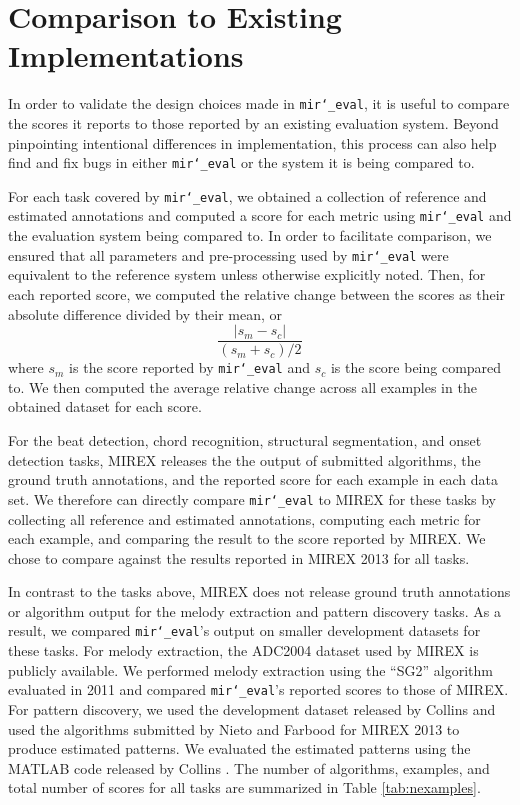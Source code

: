 \documentclass{article}
\def\mireval{\texttt{mir\char`_eval}}
\begin{document}
\section{Comparison to Existing Implementations}
\label{sec:comparison}

In order to validate the design choices made in \mireval{}, it is useful to compare the scores it reports to those reported by an existing evaluation system.
Beyond pinpointing intentional differences in implementation, this process can also help find and fix bugs in either \mireval{} or the system it is being compared to.

For each task covered by \mireval{}, we obtained a collection of reference and estimated annotations and computed a score for each metric using \mireval{} and the evaluation system being compared to.
In order to facilitate comparison, we ensured that all parameters and pre-processing used by \mireval{} were equivalent to the reference system unless otherwise explicitly noted.
Then, for each reported score, we computed the relative change between the scores as their absolute difference divided by their mean, or
$$
\frac{|s_m - s_c|}{(s_m + s_c)/2}
$$
where $s_m$ is the score reported by \mireval{} and $s_c$ is the score being compared to.
We then computed the average relative change across all examples in the obtained dataset for each score.

For the beat detection, chord recognition, structural segmentation, and onset detection tasks, MIREX releases the the output of submitted algorithms, the ground truth annotations, and the reported score for each example in each data set.
We therefore can directly compare \mireval{} to MIREX for these tasks by collecting all reference and estimated annotations, computing each metric for each example, and comparing the result to the score reported by MIREX.
We chose to compare against the results reported in MIREX 2013 for all tasks.

In contrast to the tasks above, MIREX does not release ground truth annotations or algorithm output for the melody extraction and pattern discovery tasks.
As a result, we compared \mireval{}'s output on smaller development datasets for these tasks.
For melody extraction, the ADC2004 dataset used by MIREX is publicly available.
We performed melody extraction using the ``SG2'' algorithm evaluated in 2011 \cite{salamon2011melody} and compared \mireval{}'s reported scores to those of MIREX.
For pattern discovery, we used the development dataset released by Collins \cite{Collins2013} and used the algorithms submitted by Nieto and Farbood \cite{nieto2013discovery} for MIREX 2013 to produce estimated patterns.
We evaluated the estimated patterns using the MATLAB code released by Collins \cite{Collins2013}.
The number of algorithms, examples, and total number of scores for all tasks are summarized in Table \ref{tab:nexamples}.
\end{document}
